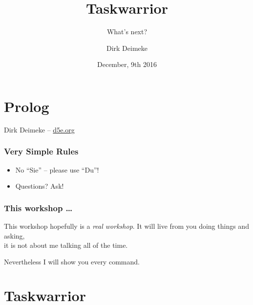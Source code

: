 \documentclass[t,handout,aspectratio=169]{beamer}
\title{Taskwarrior}
\subtitle{What's next?}
\date{December, 9th 2016}
\author{Dirk Deimeke}
\institute{Taskwarrior Academy @ TNG Technology Consulting GmbH}
\begin{document}
\begin{frame}
    \titlepage
\end{frame}

\section{Prolog}

\begin{frame}[standout]
    Dirk Deimeke -- \href{https://d5e.org/}{d5e.org}
\end{frame}

\begin{frame}[fragile]\frametitle{Very Simple Rules}
    \vfill \pause
    \begin{itemize}
        \item No ``Sie'' -- please use ``Du''! \pause
        \item Questions? Ask!
    \end{itemize}
\end{frame}

\begin{frame}[fragile]\frametitle{This workshop \ldots}
    \vfill

    \begin{alertblock}{This workshop hopefully is a \textit{real workshop}.}
        It will live from you doing things and asking, \\
        it is not about me talking all of the time.
    \end{alertblock}

    {\tiny Nevertheless I will show you every command.}
\end{frame}

\section{Taskwarrior}
\end{document}

